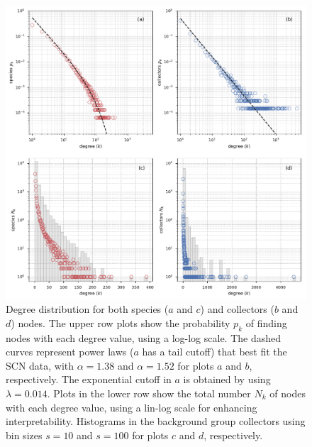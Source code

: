   \begin{figure}[h!]
  	\centering
    \includegraphics[width=\linewidth]{figures/casestudy_ub/scn_degree_dist}
    \caption{Degree distribution for both species ($a$ and $c$) and collectors ($b$ and $d$) nodes. The upper row plots show the probability $p_k$ of finding nodes with each degree value, using a log-log scale. The dashed curves represent power laws ($a$ has a tail cutoff) that best fit the SCN data, with $\alpha=1.38$ and $\alpha=1.52$ for plots $a$ and $b$, respectively. The exponential cutoff in $a$ is obtained by using $\lambda=0.014$. Plots in the lower row show the total number $N_k$ of nodes with each degree value, using a lin-log scale for enhancing interpretability. Histograms in the background group collectors using bin sizes $s=10$ and $s=100$ for plots $c$ and $d$, respectively.}
    \label{fig:ub_scn_degree_dist}
  \end{figure}
  





